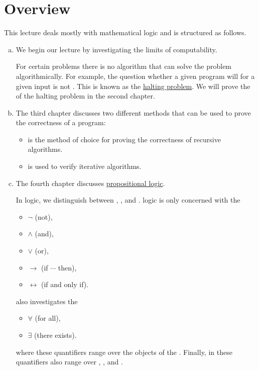 \section{Overview} 
This lecture deals mostly with mathematical logic and is structured as follows.
\begin{enumerate}[(a)]
\item We begin our lecture by investigating the limits of computability.

      For certain problems there is no algorithm that can solve the problem algorithmically. 
      For example, the question whether a given program will  for a given input is not
      .  This is known as the \href{https://en.wikipedia.org/wiki/Halting_problem}{halting problem}.  
      We will prove the  of the halting problem in the second chapter. 
\item The third chapter discusses two different methods that can be used to prove the correctness of a program:
      \begin{itemize}
      \item {} is the method of choice for proving the correctness of recursive
            algorithms.
      \item {} is used to verify iterative algorithms.
      \end{itemize}
\item The fourth chapter discusses \href{https://en.wikipedia.org/wiki/Propositional_calculus}{propositional logic}.

      In logic, we distinguish between  ,
      , and .   logic is only
      concerned with the 
      \begin{itemize}
      \item $\neg$ (not), 
      \item $\wedge$ (and),
      \item $\vee$ (or),
      \item $\rightarrow$ (if $\cdots$ then),
      \item $\leftrightarrow$ (if and only if).
      \end{itemize}
       also investigates the 
      \begin{itemize}
      \item $\forall$ (for all),
      \item $\exists$ (there exists).
      \end{itemize}
      where these quantifiers range over the objects of the .
      Finally, in  these quantifiers also range over , , and
      . 


\end{enumerate}
